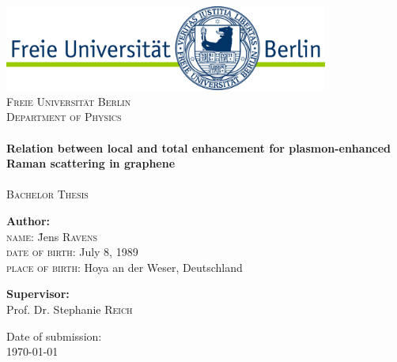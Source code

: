 
\begin{titlepage}

\begin{center}

\includegraphics[width=0.8\textwidth]{./images/free-university.jpg}\\[1cm]

\textsc{\LARGE Freie Universität Berlin}\\[0.3cm]
\textsc{\LARGE Department of Physics}\\[1.5cm]
\HRule \\[0.4cm]
{ \huge \bfseries \linespread{1.5} Relation between local and total enhancement for plasmon-enhanced Raman scattering in graphene}\\[0.4cm]

\HRule \\[1cm]

\textsc{\Large Bachelor Thesis}\\[2cm]

\begin{flushleft} \large
\begin{tabbing}
\textbf{Author:}\\
\textsc{name:} \hspace{3cm} \= Jens \textsc{Ravens} \\
\textsc{date of birth:} \> July 8, 1989 \\
\textsc{place of birth:} \> Hoya an der Weser, Deutschland
\end{tabbing}
\end{flushleft}
\begin{flushleft} \large
\textbf{Supervisor:} \\
Prof. Dr. Stephanie \textsc{Reich}
\end{flushleft}

\vfill

{\large Date of submission: \\ \today}

\end{center}

\end{titlepage}
